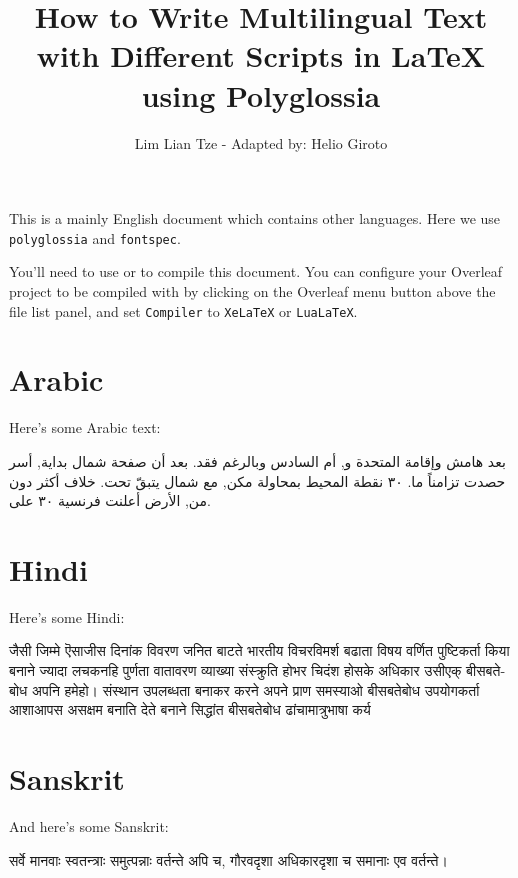 \documentclass[12pt]{scrartcl}
\title{How to Write Multilingual Text with Different Scripts in \LaTeX{} using Polyglossia}
\author{Lim Lian Tze - Adapted by: Helio Giroto}
\date{}
\begin{document}
\maketitle

This is a mainly English document which contains other languages. Here we use \texttt{polyglossia} and \texttt{fontspec}. 

You'll need to use  or  to compile this document. You can configure your Overleaf project to be compiled with  by clicking on the Overleaf menu button above the file list panel, and set \texttt{Compiler} to \texttt{XeLaTeX} or \texttt{LuaLaTeX}.



\section{Arabic}
Here's some Arabic text:

\begin{Arabic}
بعد هامش وإقامة المتحدة و, أم السادس وبالرغم فقد. بعد أن صفحة شمال بداية, أسر حصدت تزامناً ما. ٣٠ نقطة المحيط بمحاولة مكن, مع شمال يتبقّ تحت. خلاف أكثر دون من, الأرض أعلنت فرنسية ٣٠ على.
\end{Arabic}



\section{Hindi}

Here's some Hindi:

\begin{hindi}
जैसी जिम्मे ऎसाजीस दिनांक विवरण जनित बाटते भारतीय विचरविमर्श बढाता विषय वर्णित पुष्टिकर्ता किया बनाने ज्यादा लचकनहि पुर्णता वातावरण व्याख्या संस्क्रुति होभर चिदंश होसके अधिकार उसीएक् बीसबतेबोध अपनि हमेहो। संस्थान उपलब्धता बनाकर करने अपने प्राण समस्याओ बीसबतेबोध उपयोगकर्ता आशाआपस असक्षम बनाति देते बनाने सिद्धांत बीसबतेबोध ढांचामात्रुभाषा कर्य
\end{hindi}

\section{Sanskrit}
And here's some Sanskrit:

\begin{sanskrit}
सर्वे मानवाः स्वतन्त्राः समुत्पन्नाः वर्तन्ते अपि च, गौरवदृशा अधिकारदृशा च समानाः एव वर्तन्ते।
\end{sanskrit}
\end{document}
